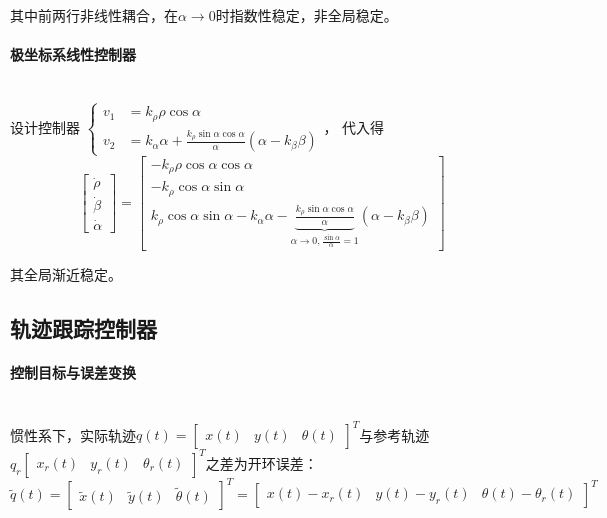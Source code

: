 \documentclass[
12pt, %
a4paper, 
oneside, %
headinclude,footinclude, %
]{scrartcl}
\begin{document}
其中前两行非线性耦合，在$ \alpha \to 0 $时指数性稳定，非全局稳定。
\paragraph{极坐标系线性控制器}~\\

设计控制器
$
\begin{cases}
v_1 &= k_\rho \rho \cos\alpha \\
v_2 &= k_\alpha \alpha + \frac{k_\rho \sin \alpha \cos\alpha}{\alpha}(\alpha - k_\beta\beta)
\end{cases}
$，
代入得
$$ \begin{bmatrix} \dot{\rho} \\ \dot{\beta} \\ \dot{\alpha} \end{bmatrix} = \begin{bmatrix} -k_\rho \rho \cos\alpha \cos\alpha \\ -k_\rho \cos\alpha \sin\alpha \\ k_\rho \cos\alpha \sin\alpha - k_\alpha \alpha - \underbrace{\frac{k_\rho \sin\alpha \cos\alpha}{\alpha}}_{\alpha \to 0, \frac{\sin\alpha}{\alpha} = 1}(\alpha - k_\beta\beta) \end{bmatrix} $$

其全局渐近稳定。
\subsection[轨迹跟踪控制器]{轨迹跟踪控制器}
\paragraph{控制目标与误差变换}~\\

惯性系下，实际轨迹$ q(t) = \begin{bmatrix} x(t) & y(t) & \theta(t) \end{bmatrix}^T $与参考轨迹$ q_r \begin{bmatrix} x_r(t) & y_r(t) & \theta_r(t) \end{bmatrix}^T $之差为开环误差：
$$ \tilde{q}(t) = \begin{bmatrix} \tilde{x}(t) & \tilde{y}(t) & \tilde{\theta}(t) \end{bmatrix}^T = \begin{bmatrix} x(t) - x_r(t) & y(t) - y_r(t) & \theta(t) - \theta_r(t) \end{bmatrix}^T $$
\end{document}
